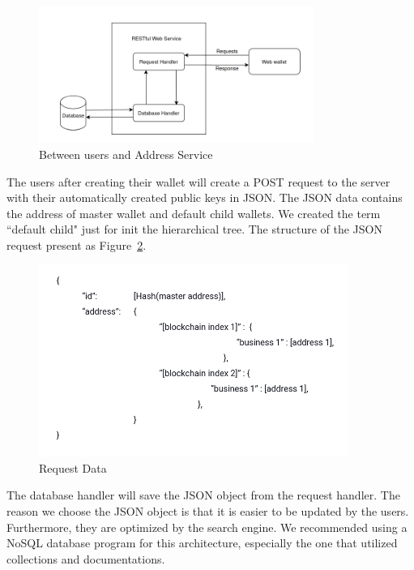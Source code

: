 \begin{figure}[!ht]
    \centering
    \includegraphics[width=0.8\textwidth]{images/design_uas.png}
    \caption[Between users and Address Service]{Between users and Address Service}
    \label{fig:uas}
\end{figure}

The users after creating their wallet will create a POST request to the server with their automatically created public keys in JSON.
The JSON data contains the address of master wallet and default child wallets.
We created the term ``default child" just for init the hierarchical tree.
The structure of the JSON request present as Figure~\ref{fig:json}.

\begin{figure}[!ht]
    \centering
    \includegraphics[width=0.9\textwidth]{images/design_json.png}
    \caption[Request Data]{Request Data}
    \label{fig:json}
\end{figure}

The database handler will save the JSON object from the request handler. The reason we choose the JSON object is that it is easier to be updated by the users. Furthermore, they are optimized by the search engine. We recommended using a NoSQL database program for this architecture, especially the one that utilized collections and documentations.

